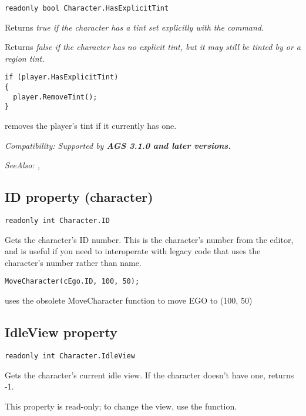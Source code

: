 \begin{verbatim}
readonly bool Character.HasExplicitTint
\end{verbatim}
Returns \it{true} if the character has a tint set explicitly with the
 command.

Returns \it{false} if the character has no explicit tint, but it may still be
tinted by  or a region tint.

\begin{verbatim}
if (player.HasExplicitTint)
{
  player.RemoveTint();
}
\end{verbatim}
removes the player's tint if it currently has one.

\it{Compatibility:} Supported by \bf{AGS 3.1.0} and later versions.

\it{SeeAlso:} ,


\subsection{ID property (character)}\label{Character.ID}%

\begin{verbatim}
readonly int Character.ID
\end{verbatim}
Gets the character's ID number. This is the character's number from the editor, and is
useful if you need to interoperate with legacy code that uses the character's number
rather than name.

\begin{verbatim}
MoveCharacter(cEgo.ID, 100, 50);
\end{verbatim}
uses the obsolete MoveCharacter function to move EGO to (100, 50)


\subsection{IdleView property}\label{Character.IdleView}%

\begin{verbatim}
readonly int Character.IdleView
\end{verbatim}
Gets the character's current idle view. If the character doesn't have one, returns -1.

This property is read-only; to change the view, use the 
function.

